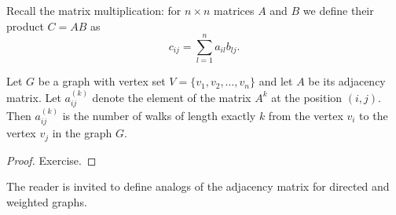 \begin{page}
\setcounter{section}{1}
\setcounter{subsection}{4}
\setcounter{dfn}{12}
\label{portion:180}


Recall the matrix multiplication: for $n \times n$ matrices $A$ and $B$ we define their product $C = AB$ as
\[
c_{ij} = \sum_{l=1}^n a_{il} b_{lj}.
\]


\end{page}

\begin{page}
\setcounter{section}{1}
\setcounter{subsection}{4}
\setcounter{dfn}{13}
\label{portion:182}

\begin{thm}
Let $G$ be a graph with vertex set $V = \{v_1, v_2, \ldots, v_n\}$ and let $A$ be its adjacency matrix.
Let $a^{(k)}_{ij}$ denote the element of the matrix $A^k$ at the position $(i,j)$.
Then $a^{(k)}_{ij}$ is the number of walks of length exactly $k$ from the vertex $v_i$ to the vertex $v_j$ in the graph $G$.
\end{thm}

\end{page}

\begin{page}
\setcounter{section}{1}
\setcounter{subsection}{5}
\setcounter{dfn}{13}
\label{portion:183}

\begin{proof}
Exercise.
% 
\end{proof}

The reader is invited to define analogs of the adjacency matrix for directed and weighted graphs.



\end{page}

